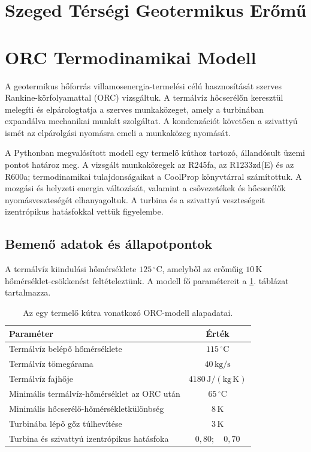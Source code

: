 \documentclass[12pt]{article}
\begin{document}

\newpage \section{Szeged Térségi Geotermikus Erőmű} 

\newpage \section{ORC Termodinamikai Modell}

A geotermikus hőforrás villamosenergia-termelési célú hasznosítását
szerves Rankine-körfolyamattal (ORC) vizsgáltuk.
A termálvíz hőcserélőn keresztül melegíti és elpárologtatja a szerves
munkaközeget, amely a turbinában expandálva mechanikai munkát szolgáltat.
A kondenzációt követően a szivattyú ismét az elpárolgási nyomásra emeli
a munkaközeg nyomását.

A Pythonban megvalósított modell egy termelő kúthoz tartozó,
állandósult üzemi pontot határoz meg. A vizsgált munkaközegek az
R245fa, az R1233zd(E) és az R600a; termodinamikai tulajdonságaikat
a CoolProp könyvtárral számítottuk. A mozgási és helyzeti energia
változását, valamint a csővezetékek és hőcserélők nyomásveszteségét
elhanyagoltuk. A turbina és a szivattyú veszteségeit izentrópikus
hatásfokkal vettük figyelembe.

\subsection{Bemenő adatok és állapotpontok}

A termálvíz kiindulási hőmérséklete $125\,^\circ\mathrm{C}$,
amelyből az erőműig $10\,\mathrm{K}$ hőmérséklet-csökkenést
feltételeztünk. A modell fő paramétereit a
\ref{tab:orc_adatok}. táblázat tartalmazza.

\begin{table}[htbp]
    \centering
    \caption{Az egy termelő kútra vonatkozó ORC-modell alapadatai.}
    \label{tab:orc_adatok}
    \begin{tabular}{lc}
        \toprule
        \textbf{Paraméter} & \textbf{Érték} \\
        \midrule
        Termálvíz belépő hőmérséklete & $115\,^\circ\mathrm{C}$ \\
        Termálvíz tömegárama & $40\,\mathrm{kg/s}$ \\
        Termálvíz fajhője & $4180\,\mathrm{J/(kg\,K)}$ \\
        Minimális termálvíz-hőmérséklet az ORC után
            & $65\,^\circ\mathrm{C}$ \\
        Minimális hőcserélő-hőmérsékletkülönbség
            & $8\,\mathrm{K}$ \\
        Turbinába lépő gőz túlhevítése & $3\,\mathrm{K}$ \\
        Turbina és szivattyú izentrópikus hatásfoka
            & $0{,}80;\quad 0{,}70$ \\
        \bottomrule
    \end{tabular}
\end{table}
\end{document}
